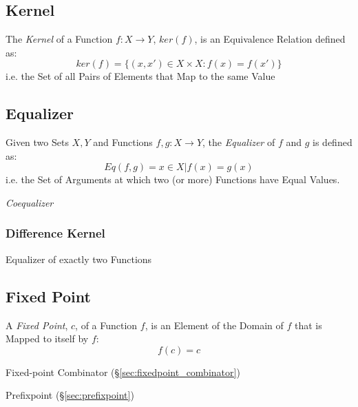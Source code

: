 \subsection{Kernel}\label{sec:function_kernel}

The \emph{Kernel} of a Function $f : X \rightarrow Y$, $ker(f)$, is an
Equivalence Relation defined as:
\[
  ker(f) = \{ (x,x') \in X \times X : f(x) = f(x') \}
\]
i.e. the Set of all Pairs of Elements that Map to the same Value



\subsection{Equalizer}\label{sec:function_equalizer}

Given two Sets $X,Y$ and Functions $f,g : X \rightarrow Y$, the
\emph{Equalizer} of $f$ and $g$ is defined as:
\[
  Eq(f,g) = { x \in X | f(x) = g(x) }
\]
i.e. the Set of Arguments at which two (or more) Functions have Equal
Values.


\emph{Coequalizer}



\subsubsection{Difference Kernel}\label{sec:difference_equalizer}

Equalizer of exactly two Functions



\subsection{Fixed Point}\label{sec:fixed_point}

A \emph{Fixed Point}, $c$, of a Function $f$, is an Element of the
Domain of $f$ that is Mapped to itself by $f$:
\[
  f(c) = c
\]

Fixed-point Combinator (\S\ref{sec:fixedpoint_combinator})

Prefixpoint (\S\ref{sec:prefixpoint})

